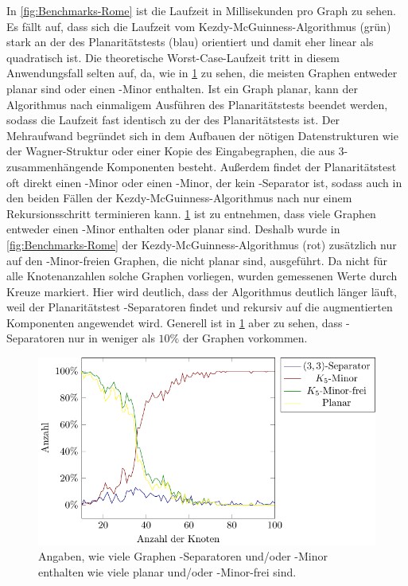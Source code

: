 In \Abb \ref{fig:Benchmarks-Rome} ist die Laufzeit in Millisekunden pro Graph zu sehen.
Es fällt auf, dass sich die Laufzeit vom Kezdy-McGuinness-Algorithmus (grün) stark an der des Planaritätstests (blau) orientiert und damit eher linear als quadratisch ist.
Die theoretische Worst-Case-Laufzeit tritt in diesem Anwendungsfall selten auf, da, wie in \Abb \ref{fig:Statistics-Rome} zu sehen, die meisten Graphen entweder planar sind oder einen \kf-Minor enthalten.
Ist ein Graph planar, kann der Algorithmus nach einmaligem Ausführen des Planaritätstests beendet werden, sodass die Laufzeit fast identisch zu der des Planaritätstests ist.
Der Mehraufwand begründet sich in dem Aufbauen der nötigen Datenstrukturen wie der Wagner-Struktur oder einer Kopie des Eingabegraphen, die aus $3$-zusammenhängende Komponenten besteht.
Außerdem findet der Planaritätstest oft direkt einen \kf-Minor oder einen \kdd-Minor, der kein \dd-Separator ist, sodass auch in den beiden Fällen der Kezdy-McGuinness-Algorithmus nach nur einem Rekursionsschritt terminieren kann.
\Abb \ref{fig:Statistics-Rome} ist zu entnehmen, dass viele Graphen entweder einen \kf-Minor enthalten oder planar sind.
Deshalb wurde in \Abb \ref{fig:Benchmarks-Rome} der Kezdy-McGuinness-Algorithmus (rot) zusätzlich nur auf den \kf-Minor-freien Graphen, die nicht planar sind, ausgeführt.
Da nicht für alle Knotenanzahlen solche Graphen vorliegen, wurden gemessenen Werte durch Kreuze markiert.
Hier wird deutlich, dass der Algorithmus deutlich länger läuft, weil der Planaritätstest \dd-Separatoren findet und rekursiv auf die augmentierten Komponenten angewendet wird.
Generell ist in \Abb \ref{fig:Statistics-Rome} aber zu sehen, dass \dd-Separatoren nur in weniger als $10\%$ der Graphen vorkommen.

\begin{figure}[H]
  \centering
  \includegraphics[width=\textwidth,height=\textheight,keepaspectratio]{plots/Statistics_Rome.pdf}
  \caption{Angaben, wie viele Graphen \dd-Separatoren und/oder \kf-Minor enthalten \bzw wie viele planar und/oder \kf-Minor-frei sind.}
  \label{fig:Statistics-Rome}
\end{figure}

